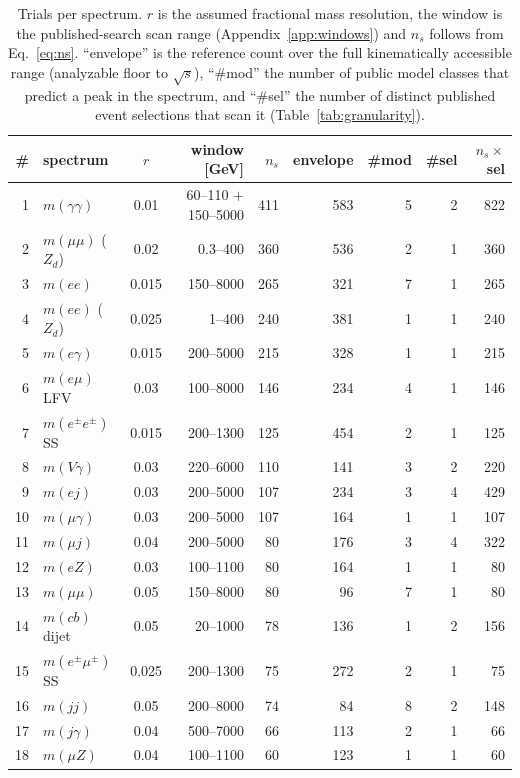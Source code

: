 \begin{table}[htbp]
\centering
\small
\caption{Trials per spectrum. $r$ is the assumed fractional mass resolution, the window is the
published-search scan range (Appendix~\ref{app:windows}) and $n_s$ follows from
Eq.~\eqref{eq:ns}. ``envelope'' is the reference count over the full kinematically accessible
range (analyzable floor to $\sqrt{s}$), ``\#mod'' the number of public model classes that predict a
peak in the spectrum, and ``\#sel'' the number of distinct published event selections that scan it
(Table~\ref{tab:granularity}).}
\label{tab:budget}
\begin{tabular}{rlcrrrrrr}
\toprule
\# & spectrum & $r$ & window [GeV] & $n_s$ & envelope & \#mod & \#sel & $n_s\times$sel \\
\midrule
1 & $m(\gamma\gamma)$ & 0.01 & 60--110 $+$ 150--5000 & 411 & 583 & 5 & 2 & 822\\
2 & $m(\mu\mu)$ ($Z_d$) & 0.02 & 0.3--400 & 360 & 536 & 2 & 1 & 360\\
3 & $m(ee)$ & 0.015 & 150--8000 & 265 & 321 & 7 & 1 & 265\\
4 & $m(ee)$ ($Z_d$) & 0.025 & 1--400 & 240 & 381 & 1 & 1 & 240\\
5 & $m(e\gamma)$ & 0.015 & 200--5000 & 215 & 328 & 1 & 1 & 215\\
6 & $m(e\mu)$ LFV & 0.03 & 100--8000 & 146 & 234 & 4 & 1 & 146\\
7 & $m(e^\pm e^\pm)$ SS & 0.015 & 200--1300 & 125 & 454 & 2 & 1 & 125\\
8 & $m(V\gamma)$ & 0.03 & 220--6000 & 110 & 141 & 3 & 2 & 220\\
9 & $m(ej)$ & 0.03 & 200--5000 & 107 & 234 & 3 & 4 & 429\\
10 & $m(\mu\gamma)$ & 0.03 & 200--5000 & 107 & 164 & 1 & 1 & 107\\
11 & $m(\mu j)$ & 0.04 & 200--5000 & 80 & 176 & 3 & 4 & 322\\
12 & $m(eZ)$ & 0.03 & 100--1100 & 80 & 164 & 1 & 1 & 80\\
13 & $m(\mu\mu)$ & 0.05 & 150--8000 & 80 & 96 & 7 & 1 & 80\\
14 & $m(cb)$ dijet & 0.05 & 20--1000 & 78 & 136 & 1 & 2 & 156\\
15 & $m(e^\pm\mu^\pm)$ SS & 0.025 & 200--1300 & 75 & 272 & 2 & 1 & 75\\
16 & $m(jj)$ & 0.05 & 200--8000 & 74 & 84 & 8 & 2 & 148\\
17 & $m(j\gamma)$ & 0.04 & 500--7000 & 66 & 113 & 2 & 1 & 66\\
18 & $m(\mu Z)$ & 0.04 & 100--1100 & 60 & 123 & 1 & 1 & 60\\

\end{tabular}
\end{table}
